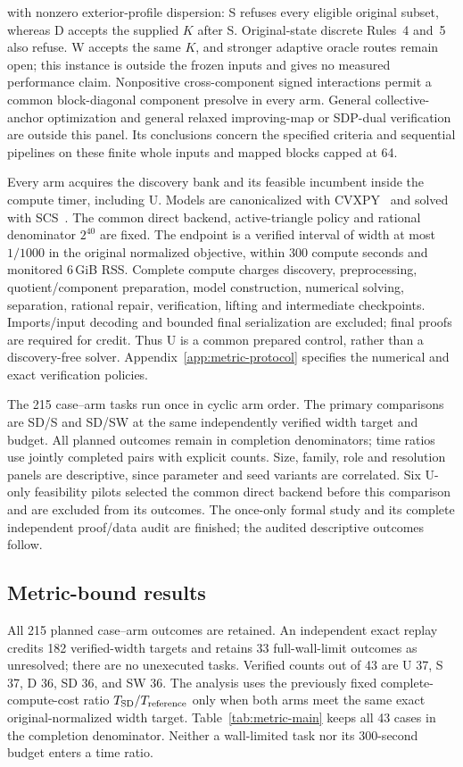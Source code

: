 \documentclass[sigconf,anonymous,review]{acmart}
\newcommand{\1}{\mathbf{1}}
\begin{document}
with nonzero exterior-profile dispersion: S refuses every eligible original
subset, whereas D accepts the supplied $K$ after S. Original-state discrete
Rules~4 and~5 also refuse. W accepts the same $K$, and stronger adaptive
oracle routes remain open; this instance is outside the frozen inputs and
gives no measured performance claim.
Nonpositive cross-component signed
interactions permit a common block-diagonal component presolve in every arm.
General collective-anchor optimization and general relaxed improving-map or
SDP-dual verification are outside this panel. Its conclusions concern the
specified criteria and sequential pipelines on these finite whole inputs and
mapped blocks capped at 64.

Every arm acquires the discovery bank and its feasible incumbent inside the
compute timer, including U. Models are canonicalized with CVXPY~\cite{diamond2016cvxpy} and solved
with SCS~\cite{odonoghue2016scs}. The common direct backend,
active-triangle policy and rational denominator $2^{40}$ are fixed. The endpoint is a
verified interval of width at most $1/1000$ in the original normalized
objective, within 300 compute seconds and monitored 6\,GiB RSS. Complete
compute charges discovery, preprocessing, quotient/component preparation,
model construction, numerical solving, separation, rational repair,
verification, lifting and intermediate checkpoints. Imports/input decoding
and bounded final serialization are excluded; final proofs are required for
credit. Thus U is a common prepared control, rather than a discovery-free
solver. Appendix~\ref{app:metric-protocol} specifies the numerical and exact
verification policies.

The 215 case--arm tasks run once in cyclic arm order. The primary comparisons
are SD/S and SD/SW at the same independently verified width target and budget.
All planned outcomes remain in completion denominators; time ratios use
jointly completed pairs with explicit counts. Size, family, role and
resolution panels are descriptive, since parameter and seed variants are
correlated. Six U-only feasibility pilots selected the common direct backend
before this comparison and are excluded from its outcomes. The once-only
formal study and its complete independent proof/data audit are finished;
the audited descriptive outcomes follow.

\subsection{Metric-bound results}
All 215 planned case--arm outcomes are retained. An independent exact replay
credits 182 verified-width targets and retains 33 full-wall-limit outcomes as
unresolved; there are no unexecuted tasks. Verified counts out of 43 are
U 37, S 37, D 36, SD 36, and SW 36. The analysis uses the previously fixed
complete-compute-cost ratio $T_{\rm SD}/T_{\rm reference}$ only when both
arms meet the same exact original-normalized width target. Table~\ref{tab:metric-main}
keeps all 43 cases in the completion denominator. Neither a wall-limited task
nor its 300-second budget enters a time ratio.
\end{document}
